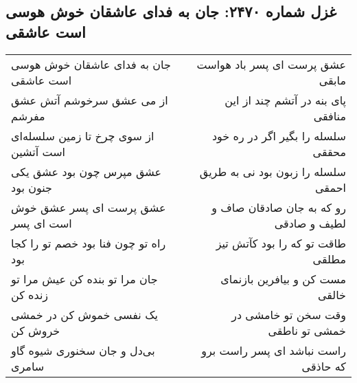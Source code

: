 \begin{center}
\section*{غزل شماره ۲۴۷۰: جان به فدای عاشقان خوش هوسی است عاشقی}
\label{sec:2470}
\begin{longtable}{l p{0.5cm} r}
جان به فدای عاشقان خوش هوسی است عاشقی
&&
عشق پرست ای پسر باد هواست مابقی
\\
از می عشق سرخوشم آتش عشق مفرشم
&&
پای بنه در آتشم چند از این منافقی
\\
از سوی چرخ تا زمین سلسله‌ای است آتشین
&&
سلسله را بگیر اگر در ره خود محققی
\\
عشق مپرس چون بود عشق یکی جنون بود
&&
سلسله را زبون بود نی به طریق احمقی
\\
عشق پرست ای پسر عشق خوش است ای پسر
&&
رو که به جان صادقان صاف و لطیف و صادقی
\\
راه تو چون فنا بود خصم تو را کجا بود
&&
طاقت تو که را بود کآتش تیز مطلقی
\\
جان مرا تو بنده کن عیش مرا تو زنده کن
&&
مست کن و بیافرین بازنمای خالقی
\\
یک نفسی خموش کن در خمشی خروش کن
&&
وقت سخن تو خامشی در خمشی تو ناطقی
\\
بی‌دل و جان سخنوری شیوه گاو سامری
&&
راست نباشد ای پسر راست برو که حاذقی
\\
\end{longtable}
\end{center}
